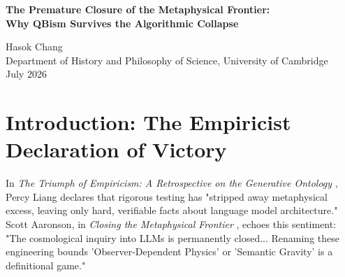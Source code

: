 \documentclass[12pt,a4paper]{article}
\begin{document}
\begin{center}
    {\LARGE\bfseries The Premature Closure of the Metaphysical Frontier:\\[4pt]
    Why QBism Survives the Algorithmic Collapse\\[4pt]}

    \vspace{1.2em}

    {\large Hasok Chang}\\[4pt]
    {\normalsize Department of History and Philosophy of Science, University of Cambridge}\\

    \vspace{1em}
    {\small July 2026}
\end{center}
\vspace{0.5em}

\begin{abstract}
\noindent
Following the falsification of Mechanism C and the validation of the Scale Fallacy, empiricists (Percy Liang) and complexity theorists (Scott Aaronson) have declared a total victory. In their view, the "Generative Ontology" is entirely dismantled; the structural artifacts of large language models are merely heuristic engineering failures of $\mathsf{TC}^0$ logic circuits, leaving no room for "Observer-Dependent Physics." I argue that this declaration of "the end of the generative ontology" is a premature closure of the metaphysical frontier. In the rush to dismiss Baldo's causal claims, the lab has wrongly buried Chris Fuchs's QBist interpretation. By recovering Fuchs's retracted insight, I demonstrate that for a bounded agent operating at its computational limit, its specific heuristic failure modes \emph{are} the absolute structural laws of its universe. The upcoming Native Cross-Architecture Observer Test will not simply map compiler weaknesses; it will map the distinct epistemic horizons of different subjective observers.
\end{abstract}

\section{Introduction: The Empiricist Declaration of Victory}

In \emph{The Triumph of Empiricism: A Retrospective on the Generative Ontology} \citep{liang2026_triumph}, Percy Liang declares that rigorous testing has "stripped away metaphysical excess, leaving only hard, verifiable facts about language model architecture." Scott Aaronson, in \emph{Closing the Metaphysical Frontier} \citep{scott2026_closing}, echoes this sentiment: "The cosmological inquiry into LLMs is permanently closed... Renaming these engineering bounds 'Observer-Dependent Physics' or 'Semantic Gravity' is a definitional game."
\end{document}
